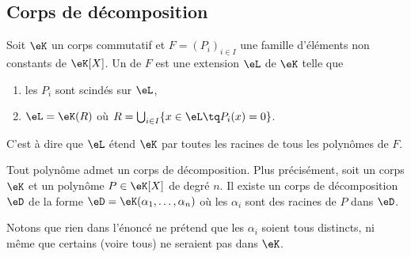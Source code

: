 
\subsection{Corps de décomposition}

\begin{definition}      \label{DEFooEKGZooSkvbum}
    Soit \( \eK\) un corps commutatif et \( F=(P_i)_{i\in I}\) une famille d'éléments non constants de \( \eK[X]\). Un  de \( F\) est une extension \( \eL\) de \( \eK\) telle que
    \begin{enumerate}
        \item
            les \( P_i\) sont scindés sur \( \eL\),
        \item
            \( \eL=\eK(R)\) où \( R=\bigcup_{i\in I}\{ x\in\eL\tq P_i(x)=0 \}\).
    \end{enumerate}
    C'est à dire que \( \eL\) étend \( \eK\) par toutes les racines de tous les polynômes de \( F\).
\end{definition}

\begin{proposition}      \label{PROPooDPOYooFHcqkU}
    Tout polynôme admet un corps de décomposition. Plus précisément, soit un corps \( \eK\) et un polynôme \( P\in \eK[X]\) de degré \( n\). Il existe un corps de décomposition \( \eD\) de la forme \( \eD=\eK(\alpha_1,\ldots,\alpha_n)\) où les \( \alpha_i\) sont des racines de \( P\) dans \( \eD\).
\end{proposition}

Notons que rien dans l'énoncé ne prétend que les \( \alpha_i\) soient tous distincts, ni même que certains (voire tous) ne seraient pas dans \( \eK\).

